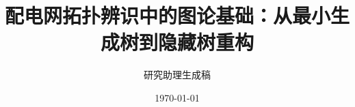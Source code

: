 ﻿\documentclass[UTF8,openany,12pt]{ctexbook}
\title{配电网拓扑辨识中的图论基础：从最小生成树到隐藏树重构}
\author{研究助理生成稿}
\date{\today}
\numberwithin{equation}{chapter}
\theoremstyle{definition}
\theoremstyle{plain}
\begin{document}
\frontmatter
\maketitle
\tableofcontents

\mainmatter













\backmatter
\nocite{*}


\end{document}

